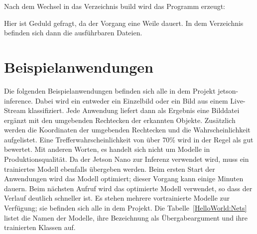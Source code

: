 \medskip

Nach dem Wechsel in das Verzeichnis build wird das Programm erzeugt:

\medskip






\medskip


Hier ist Geduld gefragt, da der  Vorgang eine Weile dauert. In dem Verzeichnis 
 befinden sich dann die ausführbaren Dateien.




\section{Beispielanwendungen}

Die folgenden Beispielanwendungen befinden sich alle in dem Projekt jetson-inference. Dabei wird ein entweder ein Einzelbild oder ein Bild aus einem Live-Stream klassifiziert. Jede Anwendung liefert dann als Ergebnis eine Bilddatei ergänzt mit den umgebenden Rechtecken der erkannten Objekte. Zusätzlich werden die Koordinaten der umgebenden Rechtecken und die Wahrscheinlichkeit aufgelistet. Eine Trefferwahrscheinlichkeit von über 70\% wird in der Regel als gut bewertet. Mit anderen Worten, es handelt sich nicht um Modelle in Produktionsqualität. Da der Jetson Nano zur  Inferenz verwendet wird, muss ein trainiertes Modell ebenfalls übergeben werden. Beim ersten Start der Anwendungen wird das Modell optimiert; dieser Vorgang kann einige Minuten dauern. Beim nächsten Aufruf wird das optimierte Modell verwendet, so dass der Verlauf deutlich schneller ist.  Es stehen mehrere vortrainierte Modelle zur Verfügung; sie befinden sich alle in dem Projekt. Die Tabelle~\ref{HelloWorld:Nets} listet die Namen der Modelle, ihre Bezeichnung als Übergabeargument und ihre trainierten Klassen auf. 



